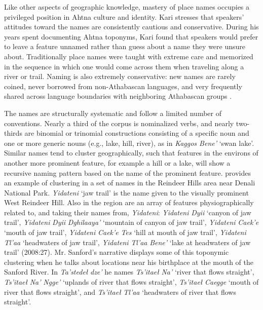 Like other aspects of geographic knowledge, mastery of place names occupies a privileged position in Ahtna culture and identity. Kari stresses that speakers’ attitudes toward the names are consistently cautious and conservative. During his years spent documenting Ahtna toponyms, Kari found that speakers would prefer to leave a feature unnamed rather than guess about a name they were unsure about. Traditionally place names were taught with extreme care and memorized in the sequence in which one would come across them when traveling along a river or trail. Naming is also extremely conservative: new names are rarely coined, never borrowed from non-Athabascan languages, and very frequently shared across language boundaries with neighboring Athabascan groups \citep{Kari2008}.

The names are structurally systematic and follow a limited number of conventions. Nearly a third of the corpus is nominalized verbs, and nearly two-thirds are binomial or trinomial constructions consisting of a specific noun and one or more generic nouns (e.g., lake, hill, river), as in \textit{Kaggos Bene’} ‘swan lake’. Similar names tend to cluster geographically, such that features in the environs of another more prominent feature, for example a hill or a lake, will show a recursive naming pattern based on the name of the prominent feature. \citet{Kari2008} provides an example of clustering in a set of names in the Reindeer Hills area near Denali National Park. \textit{Yidateni} ‘jaw trail’ is the name given to the visually prominent West Reindeer Hill. Also in the region are an array of features physiographically related to, and taking their names from, \textit{Yidateni}: \textit{Yidateni} \textit{Dyii} ‘canyon of jaw trail’, \textit{Yidateni} \textit{Dyii} \textit{Dghilaaya’} ‘mountain of canyon of jaw trail’, \textit{Yidateni} \textit{Caek’e} ‘mouth of jaw trail’, \textit{Yidateni} \textit{Caek’e} \textit{Tes} ‘hill at mouth of jaw trail’, \textit{Yidateni} \textit{Tl’aa} ‘headwaters of jaw trail’, \textit{Yidateni} \textit{Tl’aa} \textit{Bene’} ‘lake at headwaters of jaw trail’ (2008:27). Mr. Sanford’s narrative displays some of this toponymic clustering when he talks about locations near his birthplace at the mouth of the Sanford River. In \textit{Ta’stedeł} \textit{dze’} he names \textit{Ts’itaeł} \textit{Na’} ‘river that flows straight’, \textit{Ts’itaeł} \textit{Na’} \textit{Ngge’} ‘uplands of river that flows straight’, \textit{Ts’itaeł} \textit{Caegge} ‘mouth of river that flows straight’, and \textit{Ts’itaeł} \textit{Tl’aa} ‘headwaters of river that flows straight’.

